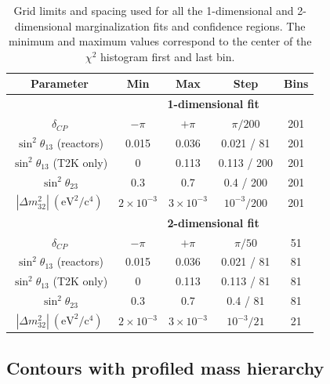 \begin{table}[htb]
\centering
\begin{tabular}{| c | c | c | c | c |}
\hline
Parameter 					& Min 			& Max			& Step			& Bins	  	\\
\hline

& \multicolumn{4}{c|}{\bf 1-dimensional fit}  \\
\hline
$\delta_{CP}$ 					& $-\pi$			& $+\pi$			& $\pi / 200$		& 201		\\
$\sin^2 \theta_{13}$ 	(reactors)	 	& 0.015			& 0.036			& 0.021 / 81		& 201 		\\
$\sin^2 \theta_{13}$ 	(T2K only) 	& 0				& 0.113			& 0.113 / 200		& 201 		\\
$\sin^2 \theta_{23}$ 				& 0.3				& 0.7				& 0.4 / 200 		& 201		\\
$|\Delta m^2_{32}|~(\text{eV}^2 / \text{c}^4)$ 			& $2\times10^{-3}$	& $3\times10^{-3}$	& $10^{-3} / 200$	& 201 		\\
\hline

& \multicolumn{4}{c|}{\bf 2-dimensional fit}  \\
\hline
$\delta_{CP}$ 					& $-\pi$			& $+\pi$			& $\pi / 50$		& 51			\\
$\sin^2 \theta_{13}$ 	(reactors)	 	& 0.015			& 0.036			& 0.021 / 81		& 81	 		\\
$\sin^2 \theta_{13}$ 	(T2K only) 	& 0				& 0.113			& 0.113 / 81		& 81 			\\
$\sin^2 \theta_{23}$ 				& 0.3				& 0.7				& 0.4 / 81 			& 81			\\
$|\Delta m^2_{32}|~(\text{eV}^2 / \text{c}^4)$ 			& $2\times10^{-3}$	& $3\times10^{-3}$	& $10^{-3} / 21$	& 21 			\\
\hline

\end{tabular}
\caption{
Grid limits and spacing used for all the 1-dimensional and 2-dimensional marginalization fits and confidence regions.
The minimum and maximum values correspond to the center of the $\chi^2$ histogram first and last bin.
}
\label{tab:marg_binnning}
\end{table}






\subsection{Contours with profiled mass hierarchy}
\label{sec:cl_mh}

